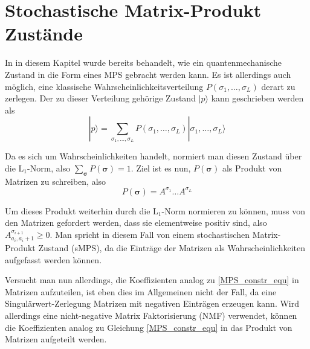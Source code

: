 \documentclass[10pt,a4paper]{report}
\newcommand{\SumIndex}{\sigma_1,\ldots,\sigma_L}
\begin{document}
\section{Stochastische Matrix-Produkt Zustände}
In in diesem Kapitel wurde bereits behandelt, wie ein quantenmechanische Zustand in die Form eines MPS gebracht werden kann. Es ist allerdings auch möglich, eine klassische Wahrscheinlichkeitsverteilung $P(\SumIndex)$ derart zu zerlegen. Der zu dieser Verteilung gehörige Zustand $|p\rangle$ kann geschrieben werden als
\begin{equation}
|p\rangle=\sum_{\SumIndex}P(\SumIndex)|\SumIndex\rangle
\end{equation}

Da es sich um Wahrscheinlichkeiten handelt, normiert man diesen Zustand über die $\text{L}_1$-Norm, also $\sum_{\bm{\sigma}}P(\bm{\sigma})=1$. Ziel ist es nun, $P(\bm{\sigma})$ als Produkt von Matrizen zu schreiben, also
\begin{equation}
P(\bm{\sigma})=A^{\sigma_1}\ldots A^{\sigma_L}
\end{equation}

Um dieses Produkt weiterhin durch die $\text{L}_1$-Norm normieren zu können, muss von den Matrizen gefordert werden, dass sie elementweise positiv sind, also $A_{a_i,a_i+1}^{\sigma_{i+1}}\geq 0$. Man spricht in diesem Fall von einem stochastischen Matrix-Produkt Zustand (sMPS), da die Einträge der Matrizen als Wahrscheinlichkeiten aufgefasst werden können.

Versucht man nun allerdings, die Koeffizienten analog zu \ref{MPS_constr_equ} in Matrizen aufzuteilen, ist eben dies im Allgemeinen nicht der Fall, da eine Singulärwert-Zerlegung Matrizen mit negativen Einträgen erzeugen kann. Wird allerdings eine nicht-negative Matrix Faktorisierung (NMF) verwendet, können die Koeffizienten analog zu Gleichung \ref{MPS_constr_equ} in das Produkt von Matrizen aufgeteilt werden.\\


\end{document}
